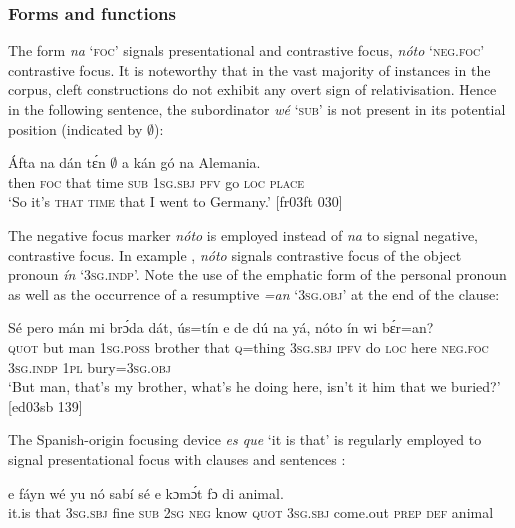 \subsubsection{Forms and functions}

The form \textit{na} ‘\textsc{foc}’ signals presentational and contrastive focus, \textit{nóto} ‘\textsc{neg}.\textsc{foc}’ contrastive focus. It is noteworthy that in the vast majority of instances in the corpus, cleft constructions do not exhibit any overt sign of relativisation. Hence in the following sentence, the subordinator \textit{wé} ‘\textsc{sub}’ is not present in its potential position (indicated by ${\emptyset}$):


\ea%
    \label{ex:key:690}
    \gll \'{A}fta    na  dán    tɛ́n    ${\emptyset}$  a    kán  gó  na  Alemania.\\
then  \textsc{foc}  that    time    \textsc{sub}  \textsc{1sg.sbj}  \textsc{pfv}  go  \textsc{loc}  \textsc{place}\\

\glt ‘So it’s \textsc{that} \textsc{time} that I went to Germany.’ [fr03ft 030]
\z

The negative focus marker \textit{nóto} is employed instead of \textit{na} to signal negative, contrastive focus. In example , \textit{nóto} signals contrastive focus of the object pronoun \textit{ín} ‘\textsc{3sg.indp}’. Note the use of the emphatic form of the personal pronoun as well as the occurrence of a resumptive \textit{=an} ‘\textsc{3sg.obj}’ at the end of the clause: 


\ea%
    \label{ex:key:691}
    \gll Sé    pero  mán  mi    brɔ́da  dát,    ús=tín  e    de  dú  na  yá,
nóto  ín    wi  bɛ́r=an?\\
\textsc{quot}    but    man  \textsc{1sg.poss}  brother  that    \textsc{q}=thing  \textsc{3sg.sbj}  \textsc{ipfv}  do  \textsc{loc}  here
\textsc{neg}.\textsc{foc}  \textsc{3sg.indp}  \textsc{1pl}  bury=\textsc{3sg.obj}\\

\glt ‘But man, that’s my brother, what’s he doing here, isn’t it him that we 
buried?’ [ed03sb 139]
\z

The Spanish-origin focusing device \textit{es que} ‘it is that’ is regularly employed to signal presentational focus with clauses and sentences : 


\ea%
    \label{ex:key:692}
    \gll {}     e    fáyn    wé  yu  nó  sabí    sé    e    kɔmɔ́t
fɔ  di  animal.  \\
it.is  that    \textsc{3sg.sbj}  fine    \textsc{sub}  \textsc{2sg}  \textsc{neg}  know  \textsc{quot}    \textsc{3sg.sbj}  come.out
\textsc{prep}  \textsc{def}  animal\\

